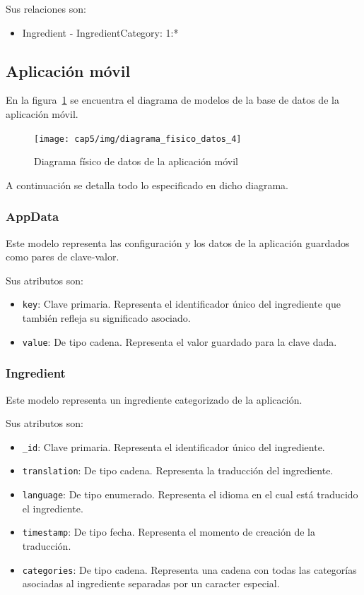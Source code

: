 Sus relaciones son:
\begin{itemize}
\item Ingredient - IngredientCategory: 1:*
\end{itemize}



\subsection{Aplicación móvil}

En la figura~\ref{fig:diagrama-fisico-datos-4} se encuentra el diagrama de
modelos de la base de datos de la aplicación móvil.


\begin{figure}[htbp]
  \centering
  \texttt{[image: cap5/img/diagrama\_fisico\_datos\_4]}
  \caption{Diagrama físico de datos de la aplicación móvil}
  \label{fig:diagrama-fisico-datos-4}
\end{figure}

A continuación se detalla todo lo especificado en dicho diagrama.


\subsubsection{AppData}

Este modelo representa las configuración y los datos de la aplicación guardados
como pares de clave-valor.

Sus atributos son:
\begin{itemize}
\item \texttt{key}: Clave primaria. Representa el identificador único del
  ingrediente que también refleja su significado asociado.
\item \texttt{value}: De tipo cadena. Representa el valor guardado para la
  clave dada.
\end{itemize}


\subsubsection{Ingredient}

Este modelo representa un ingrediente categorizado de la aplicación.

Sus atributos son:
\begin{itemize}
\item \texttt{\_id}: Clave primaria. Representa el identificador único del
  ingrediente.
\item \texttt{translation}: De tipo cadena. Representa la traducción del
  ingrediente.
\item \texttt{language}: De tipo enumerado. Representa el idioma en el cual está
  traducido el ingrediente.
\item \texttt{timestamp}: De tipo fecha. Representa el momento de creación de la
  traducción.
\item \texttt{categories}: De tipo cadena. Representa una cadena con todas las
  categorías asociadas al ingrediente separadas por un caracter especial.  
\end{itemize}



